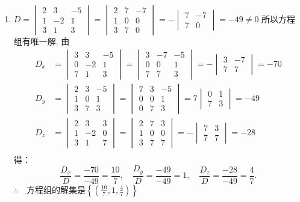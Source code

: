 \begin{solution}
\begin{enumerate}[(1)]
  \item $D=\begin{vmatrix}2&3&-5\\1&-2&1\\3&1&3\end{vmatrix}=\begin{vmatrix}2&7&-7\\1&0&0\\3&7&0\end{vmatrix}=-\begin{vmatrix}7&-7\\7&0\end{vmatrix}=-49\ne 0$
所以方程组有唯一解. 由
\[\begin{split}
D_x&=\begin{vmatrix}
  3&3&-5\\ 0&-2&1\\7&1&3
\end{vmatrix}=\begin{vmatrix}
  3&-7&-5\\0&0&1\\7&7&3
\end{vmatrix}=-\begin{vmatrix}
  3&-7\\7&7
\end{vmatrix}=-70\\
D_y&=\begin{vmatrix}
  2&3&-5\\
  1&0&1\\
  3&7&3
\end{vmatrix}=\begin{vmatrix}
  7&3&-5\\0&0&1\\ 0&7&3
\end{vmatrix}=7\begin{vmatrix}
  0&1\\7&3
\end{vmatrix}=-49\\
D_z&=\begin{vmatrix}
  2&3&3\\1&-2&0\\ 3&1&7
\end{vmatrix}=\begin{vmatrix}
  2&7&3\\1&0&0\\3&7&7
\end{vmatrix}=-\begin{vmatrix}
  7&3\\7&7
\end{vmatrix}=-28\\
\end{split}\]
得：
\[\frac{D_x}{D}=\frac{-70}{-49}=\frac{10}{7},\quad \frac{D_y}{D}=\frac{-49}{-49}=1,\quad \frac{D_z}{D}=\frac{-28}{-49}=\frac{4}{7}.\]
$\therefore\quad $方程组的解集是$\left\{\left(\frac{10}{7},1,\frac{4}{7}\right)\right\}$


\end{enumerate}
\end{solution}
